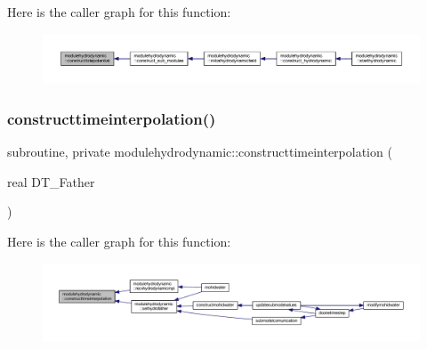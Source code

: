 Here is the caller graph for this function\+:\nopagebreak
\begin{figure}[H]
\begin{center}
\leavevmode
\includegraphics[width=350pt]{namespacemodulehydrodynamic_a2a52e863aeb7df55203e4f6646d9b4a5_icgraph}
\end{center}
\end{figure}
\mbox{\label{namespacemodulehydrodynamic_a49aef52cb34ad32b24871447f610a2a4}} 
\subsubsection{\texorpdfstring{constructtimeinterpolation()}{constructtimeinterpolation()}}
{\footnotesize\ttfamily subroutine, private modulehydrodynamic\+::constructtimeinterpolation (\begin{DoxyParamCaption}\item[{real}]{D\+T\+\_\+\+Father }\end{DoxyParamCaption})\hspace{0.3cm}{\ttfamily [private]}}

Here is the caller graph for this function\+:\nopagebreak
\begin{figure}[H]
\begin{center}
\leavevmode
\includegraphics[width=350pt]{namespacemodulehydrodynamic_a49aef52cb34ad32b24871447f610a2a4_icgraph}
\end{center}
\end{figure}
\mbox{\label{namespacemodulehydrodynamic_a4884a32bf5be45ca0a9b657f2998efa7}} 
